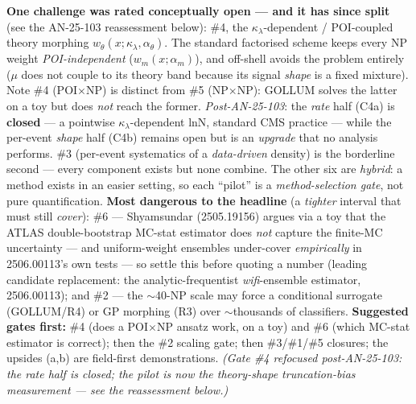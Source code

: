 \documentclass[11pt]{article}
\newcommand{\kl}{\ensuremath{\kappa_\lambda}}
\begin{document}
\begin{takeaway}
\textbf{One challenge was rated conceptually open --- and it has since split} (see the AN-25-103 reassessment
below): \#4, the \kl-dependent / POI-coupled theory morphing $w_\theta(x;\kl,\alpha_\theta)$. The standard
factorised scheme keeps every NP weight \emph{POI-independent} ($w_m(x;\alpha_m)$), and off-shell avoids the problem
entirely ($\mu$ does not couple to its theory band because its signal \emph{shape} is a fixed mixture). Note \#4
(POI$\times$NP) is distinct from \#5 (NP$\times$NP): GOLLUM solves the latter on a toy but does \emph{not} reach the
former. \emph{Post-AN-25-103}: the \emph{rate} half (C4a) is \textbf{closed} --- a pointwise \kl-dependent lnN,
standard CMS practice --- while the per-event \emph{shape} half (C4b) remains open but is an \emph{upgrade} that no
analysis performs. \#3 (per-event systematics of a \emph{data-driven} density)
is the borderline second --- every component exists but none combine. The other six are \emph{hybrid}: a method
exists in an easier setting, so each ``pilot'' is a \emph{method-selection gate}, not pure quantification.
\textbf{Most dangerous to the headline} (a \emph{tighter} interval that must still \emph{cover}): \#6 --- Shyamsundar
(2505.19156) argues via a toy that the ATLAS double-bootstrap MC-stat estimator does \emph{not} capture the
finite-MC uncertainty --- and uniform-weight ensembles under-cover \emph{empirically} in 2506.00113's own tests
--- so settle this before quoting a number (leading candidate replacement: the analytic-frequentist
\emph{wifi}-ensemble estimator, 2506.00113); and \#2 --- the $\sim$40-NP scale may force a
conditional surrogate (GOLLUM/R4) or GP morphing (R3) over $\sim$thousands of classifiers. \textbf{Suggested gates
first:} \#4 (does a POI$\times$NP ansatz work, on a toy) and \#6 (which MC-stat estimator is correct); then the \#2
scaling gate; then \#3/\#1/\#5 closures; the upsides (a,b) are field-first demonstrations. \emph{(Gate \#4
refocused post-AN-25-103: the rate half is closed; the pilot is now the theory-\emph{shape} truncation-bias
measurement --- see the reassessment below.)}
\end{takeaway}
\end{document}

